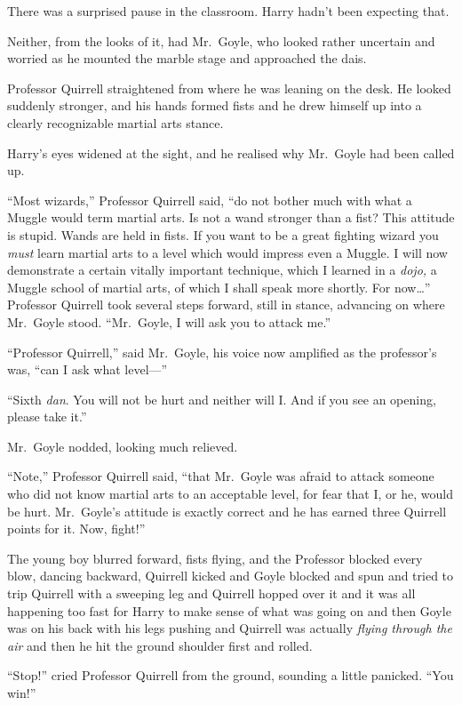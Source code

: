 There was a surprised pause in the classroom. Harry hadn't been
expecting that.

Neither, from the looks of it, had Mr.~Goyle, who looked rather
uncertain and worried as he mounted the marble stage and approached the
dais.

Professor Quirrell straightened from where he was leaning on the desk.
He looked suddenly stronger, and his hands formed fists and he drew
himself up into a clearly recognizable martial arts stance.

Harry's eyes widened at the sight, and he realised why Mr.~Goyle had
been called up.

``Most wizards,'' Professor Quirrell said, ``do not bother much with
what a Muggle would term martial arts. Is not a wand stronger than a
fist? This attitude is stupid. Wands are held in fists. If you want to
be a great fighting wizard you \emph{must} learn martial arts to a level
which would impress even a Muggle. I will now demonstrate a certain
vitally important technique, which I learned in a \emph{dojo,} a Muggle
school of martial arts, of which I shall speak more shortly. For
now\ldots{}'' Professor Quirrell took several steps forward, still in
stance, advancing on where Mr.~Goyle stood. ``Mr.~Goyle, I will ask you
to attack me.''

``Professor Quirrell,'' said Mr.~Goyle, his voice now amplified as the
professor's was, ``can I ask what level---''

``Sixth \emph{dan}. You will not be hurt and neither will I. And if you
see an opening, please take it.''

Mr.~Goyle nodded, looking much relieved.

``Note,'' Professor Quirrell said, ``that Mr.~Goyle was afraid to attack
someone who did not know martial arts to an acceptable level, for fear
that I, or he, would be hurt. Mr.~Goyle's attitude is exactly correct
and he has earned three Quirrell points for it. Now, fight!''

The young boy blurred forward, fists flying, and the Professor blocked
every blow, dancing backward, Quirrell kicked and Goyle blocked and spun
and tried to trip Quirrell with a sweeping leg and Quirrell hopped over
it and it was all happening too fast for Harry to make sense of what was
going on and then Goyle was on his back with his legs pushing and
Quirrell was actually \emph{flying through the air} and then he hit the
ground shoulder first and rolled.

``Stop!'' cried Professor Quirrell from the ground, sounding a little
panicked. ``You win!''

